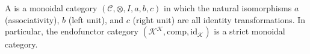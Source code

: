 A  is a monoidal category $(\mathcal{C}, \otimes, I, a, b, c)$ in which the natural isomorphisms $a$ (associativity), $b$ (left unit), and $c$ (right unit) are all identity transformations. In particular, the endofunctor category $(\mathcal{K}^\mathcal{K}, \mathrm{comp}, \mathrm{id}_\mathcal{K})$ is a strict monoidal category.
